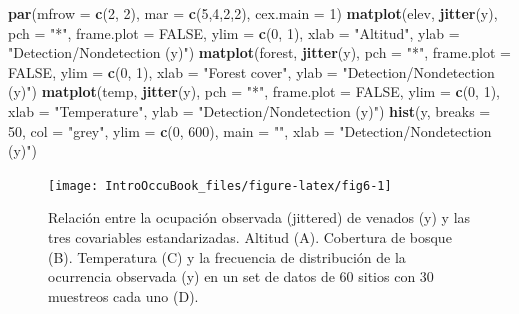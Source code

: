 \documentclass[
]{book}
\newenvironment{Shaded}{\begin{snugshade}}{\end{snugshade}}
\newcommand{\DataTypeTok}[1]{\textcolor[rgb]{0.13,0.29,0.53}{#1}}
\newcommand{\DecValTok}[1]{\textcolor[rgb]{0.00,0.00,0.81}{#1}}
\newcommand{\KeywordTok}[1]{\textcolor[rgb]{0.13,0.29,0.53}{\textbf{#1}}}
\newcommand{\NormalTok}[1]{#1}
\newcommand{\OtherTok}[1]{\textcolor[rgb]{0.56,0.35,0.01}{#1}}
\newcommand{\StringTok}[1]{\textcolor[rgb]{0.31,0.60,0.02}{#1}}
\begin{document}
\begin{Shaded}
\begin{Highlighting}[]
\KeywordTok{par}\NormalTok{(}\DataTypeTok{mfrow =} \KeywordTok{c}\NormalTok{(}\DecValTok{2}\NormalTok{, }\DecValTok{2}\NormalTok{), }\DataTypeTok{mar =} \KeywordTok{c}\NormalTok{(}\DecValTok{5}\NormalTok{,}\DecValTok{4}\NormalTok{,}\DecValTok{2}\NormalTok{,}\DecValTok{2}\NormalTok{), }\DataTypeTok{cex.main =} \DecValTok{1}\NormalTok{)}
\KeywordTok{matplot}\NormalTok{(elev, }\KeywordTok{jitter}\NormalTok{(y), }\DataTypeTok{pch =} \StringTok{"*"}\NormalTok{, }\DataTypeTok{frame.plot =} \OtherTok{FALSE}\NormalTok{, }\DataTypeTok{ylim =} \KeywordTok{c}\NormalTok{(}\DecValTok{0}\NormalTok{, }\DecValTok{1}\NormalTok{), }
        \DataTypeTok{xlab =} \StringTok{"Altitud"}\NormalTok{, }\DataTypeTok{ylab =} \StringTok{"Detection/Nondetection (y)"}\NormalTok{)}
\KeywordTok{matplot}\NormalTok{(forest, }\KeywordTok{jitter}\NormalTok{(y), }\DataTypeTok{pch =} \StringTok{"*"}\NormalTok{, }\DataTypeTok{frame.plot =} \OtherTok{FALSE}\NormalTok{, }\DataTypeTok{ylim =} \KeywordTok{c}\NormalTok{(}\DecValTok{0}\NormalTok{, }\DecValTok{1}\NormalTok{), }
        \DataTypeTok{xlab =} \StringTok{"Forest cover"}\NormalTok{, }\DataTypeTok{ylab =} \StringTok{"Detection/Nondetection (y)"}\NormalTok{)}
\KeywordTok{matplot}\NormalTok{(temp, }\KeywordTok{jitter}\NormalTok{(y), }\DataTypeTok{pch =} \StringTok{"*"}\NormalTok{, }\DataTypeTok{frame.plot =} \OtherTok{FALSE}\NormalTok{, }\DataTypeTok{ylim =} \KeywordTok{c}\NormalTok{(}\DecValTok{0}\NormalTok{, }\DecValTok{1}\NormalTok{), }
        \DataTypeTok{xlab =} \StringTok{"Temperature"}\NormalTok{, }\DataTypeTok{ylab =} \StringTok{"Detection/Nondetection (y)"}\NormalTok{)}
\KeywordTok{hist}\NormalTok{(y, }\DataTypeTok{breaks =} \DecValTok{50}\NormalTok{, }\DataTypeTok{col =} \StringTok{"grey"}\NormalTok{, }\DataTypeTok{ylim =} \KeywordTok{c}\NormalTok{(}\DecValTok{0}\NormalTok{, }\DecValTok{600}\NormalTok{), }\DataTypeTok{main =} \StringTok{""}\NormalTok{, }
     \DataTypeTok{xlab =} \StringTok{"Detection/Nondetection (y)"}\NormalTok{)}
\end{Highlighting}
\end{Shaded}

\begin{figure}
\texttt{[image: IntroOccuBook\_files/figure-latex/fig6-1]} \caption[fig6]{Relación entre la ocupación observada (jittered) de venados (y) y las tres covariables estandarizadas. Altitud (A). Cobertura de bosque (B). Temperatura (C) y la frecuencia de distribución de la ocurrencia observada (y) en un set de datos de 60 sitios con 30 muestreos cada uno (D).}\label{fig:fig6}
\end{figure}
\end{document}
